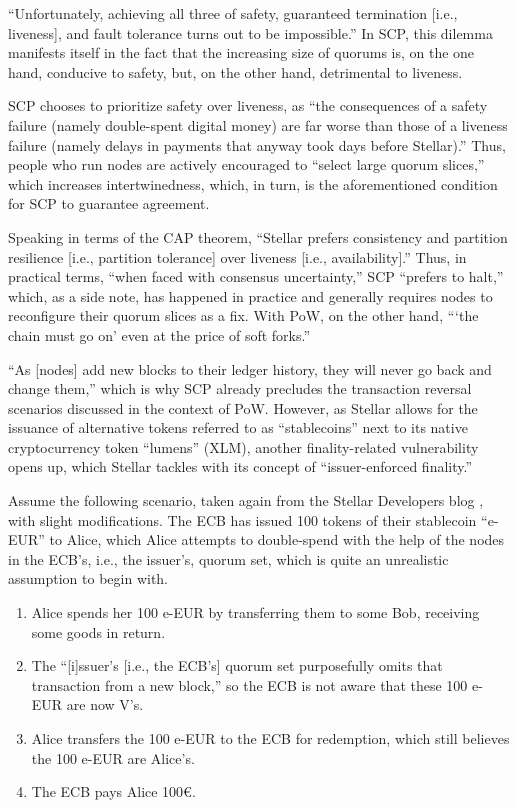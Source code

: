 ``Unfortunately, achieving all three of safety, guaranteed termination [i.e., liveness], and fault tolerance turns out to be impossible.'' \autocite{mazieres2019safetyvsliveness}
In SCP, this dilemma manifests itself in the fact that the increasing size of quorums is, on the one hand, conducive to safety, but, on the other hand, detrimental to liveness. \autocite{mazieres2019safetyvsliveness}

SCP chooses to prioritize safety over liveness, as ``the consequences of a safety failure (namely double-spent digital money) are far worse than those of a liveness failure (namely delays in payments that anyway took days before Stellar).''
Thus, people who run nodes are actively encouraged to ``select large quorum slices,'' which increases intertwinedness, which, in turn, is the aforementioned condition for SCP to guarantee agreement.

Speaking in terms of the CAP theorem, ``Stellar prefers consistency and partition resilience [i.e., partition tolerance] over liveness [i.e., availability].'' \autocite{stellar2019networkhalt}
Thus, in practical terms, ``when faced with consensus uncertainty,'' SCP ``prefers to halt,'' which, as a side note, has happened in practice and generally requires nodes to reconfigure their quorum slices as a fix. \autocite{stellar2019networkhalt}
With PoW, on the other hand, \enquote{\enquote{the chain must go on} even at the price of soft forks.} \autocite{stellar2019networkhalt}

``As [nodes] add new blocks to their ledger history, they will never go back and change them,'' which is why SCP already precludes the transaction reversal scenarios discussed in the context of PoW.
However, as Stellar allows for the issuance of alternative tokens referred to as ``stablecoins'' next to its native cryptocurrency token ``lumens'' (XLM), another finality-related vulnerability opens up, which Stellar tackles with its concept of ``issuer-enforced finality.''

Assume the following scenario, taken again from the Stellar Developers blog \autocite{stellar2020ief}, with slight modifications.
The ECB has issued 100 tokens of their stablecoin ``e-EUR'' to Alice, which Alice attempts to double-spend with the help of the nodes in the ECB's, i.e., the issuer's, quorum set, which is quite an unrealistic assumption to begin with.

\begin{enumerate}
	\item
		Alice spends her 100 e-EUR by transferring them to some Bob, receiving some goods in return.
	\item
		The ``[i]ssuer’s [i.e., the ECB's] quorum set purposefully omits that transaction from a new block,'' so the ECB is not aware that these 100 e-EUR are now V's.
	\item
		Alice transfers the 100 e-EUR to the ECB for redemption, which still believes the 100 e-EUR are Alice's.
	\item
		The ECB pays Alice 100€.
\end{enumerate}

